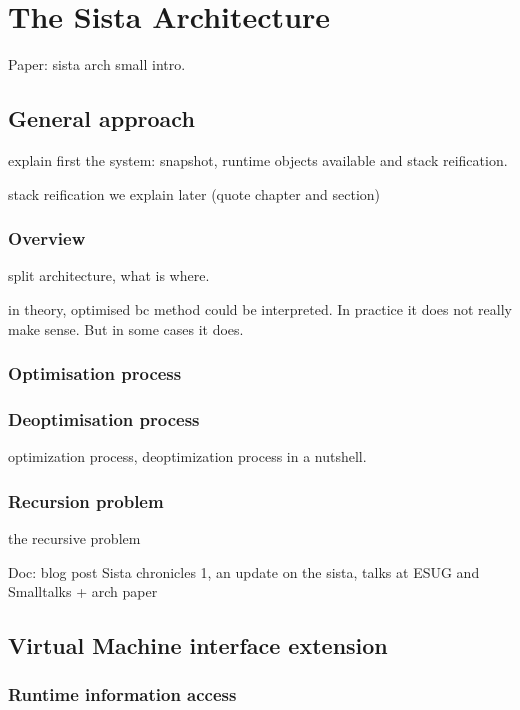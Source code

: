 \documentclass[a4paper,12pt,twoside]{../includes/ThesisStyle}
\begin{document}
\fi

\chapter{The Sista Architecture}
\label{chap:archTheory}
\minitoc

Paper: sista arch
small intro. 

\section{General approach}

explain first the system: snapshot, runtime objects available and stack reification.

stack reification we explain later (quote chapter and section) 

\subsection {Overview}

split architecture, what is where. 

in theory, optimised bc method could be interpreted. In practice it does not really make sense. But in some cases it does.

\subsection {Optimisation process}

\subsection {Deoptimisation process}

optimization process, deoptimization process in a nutshell.

\subsection{Recursion problem}

the recursive problem

Doc: blog post Sista chronicles 1, an update on the sista, talks at ESUG and Smalltalks + arch paper

\section{Virtual Machine interface extension}

\subsection{Runtime information access}
\end{document}
